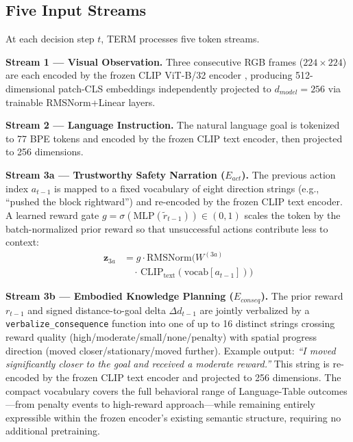 \documentclass[letterpaper]{article} %
\begin{document}
\subsection{Five Input Streams}

At each decision step $t$, TERM processes five token streams.

\textbf{Stream 1 --- Visual Observation.} Three consecutive RGB frames ($224{\times}224$) are each encoded by the frozen CLIP ViT-B/32 encoder \cite{radford2021clip,dosovitskiy2021vit}, producing 512-dimensional patch-CLS embeddings independently projected to $d_{model}{=}256$ via trainable RMSNorm+Linear layers.

\textbf{Stream 2 --- Language Instruction.} The natural language goal is tokenized to 77 BPE tokens and encoded by the frozen CLIP text encoder, then projected to 256 dimensions.

\textbf{Stream 3a --- Trustworthy Safety Narration ($E_{act}$).} The previous action index $a_{t-1}$ is mapped to a fixed vocabulary of eight direction strings (e.g., ``pushed the block rightward'') and re-encoded by the frozen CLIP text encoder. A learned reward gate $g = \sigma(\mathrm{MLP}(\tilde{r}_{t-1})) \in (0,1)$ scales the token by the batch-normalized prior reward so that unsuccessful actions contribute less to context:
\begin{equation}
\begin{split}
\mathbf{z}_{3a} &= g \cdot \mathrm{RMSNorm}\!\bigl(W^{(3a)} \\
&\quad\cdot\,\mathrm{CLIP}_{\text{text}}(\mathrm{vocab}[a_{t-1}])\bigr)
\end{split}
\end{equation}

\textbf{Stream 3b --- Embodied Knowledge Planning ($E_{conseq}$).} The prior reward $r_{t-1}$ and signed distance-to-goal delta $\Delta d_{t-1}$ are jointly verbalized by a \texttt{verbalize\_consequence} function into one of up to 16 distinct strings crossing reward quality (high/moderate/small/none/penalty) with spatial progress direction (moved closer/stationary/moved further). Example output: \textit{``I moved significantly closer to the goal and received a moderate reward.''}  This string is re-encoded by the frozen CLIP text encoder and projected to 256 dimensions. The compact vocabulary covers the full behavioral range of Language-Table outcomes---from penalty events to high-reward approach---while remaining entirely expressible within the frozen encoder's existing semantic structure, requiring no additional pretraining.
\end{document}
